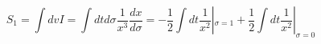 \begin{equation}\label{S1}
  S_1= \int dv I=\int d t d\sigma \frac{1}{x^3}\frac{d
x}{d\sigma}=-\frac{1}{2}\int d t\frac{1}{x^2}|_{\sigma=1}+\frac{1}{2}\int d t\frac{1}{x^2}|_{\sigma=0}
\end{equation}

